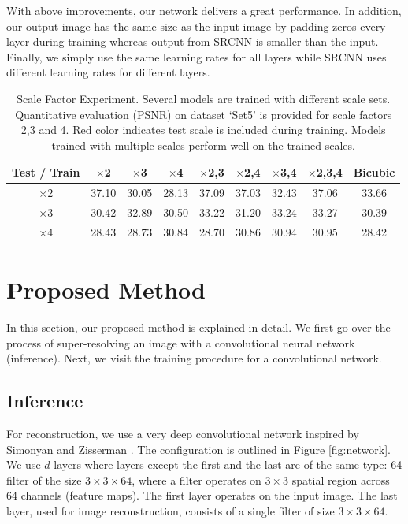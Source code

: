\documentclass[10pt,twocolumn,letterpaper]{article}
\begin{document}
With above improvements, our network delivers a great performance. In addition, our output image has the same size as the input image by padding zeros every layer during training whereas output from SRCNN is smaller than the input. Finally, we simply use the same learning rates for all layers while SRCNN uses different learning rates for different layers.

\begin{table}[t]
	\small
	\centering
\begin{tabular}
{|c|c|c|c|c|c|c|c||c|}
\hline 
 Test / Train & {$\times$2}& {$\times$3}& { $\times$4}& {$\times$2,3}& {$\times$2,4}& { $\times$3,4}& {$\times$2,3,4} & {Bicubic} \\
\hline
$\times$2  & \color{red} 37.10  & 30.05  & 28.13  & \color{red} 37.09  & \color{red} 37.03  & 32.43  & \color{red}37.06 &33.66   \\
$\times$3  & 30.42  & \color{red} 32.89  & 30.50  & \color{red} 33.22  & 31.20  & \color{red} 33.24  & \color{red} 33.27  & 30.39 \\
$\times$4  & 28.43  & 28.73  & \color{red} 30.84  & 28.70  & \color{red} 30.86  & \color{red} 30.94  & \color{red} 30.95 & 28.42  \\
\hline
\end{tabular}
	\vspace{1pt}
	\caption{Scale Factor Experiment. Several models are trained with different scale sets. Quantitative evaluation (PSNR) on dataset `Set5' is provided for scale factors 2,3 and 4.  {\color{red}Red color} indicates test scale is included during training. Models trained with multiple scales perform well on the trained scales. }
	\label{tab:SRCNN_Factor_Test}
\end{table}

\section{Proposed Method}
In this section, our proposed method is explained in detail. We first go over the process of super-resolving an image with a convolutional neural network (inference). Next, we visit the training procedure for a convolutional network.
\subsection{Inference}

For reconstruction, we use a very deep convolutional network inspired by Simonyan and Zisserman \cite{simonyan2015very}. The configuration is outlined in Figure \ref{fig:network}. We use $d$ layers where layers except the first and the last are of the same type: 64 filter of the size $3\times 3 \times64$, where a filter operates on $3\times3$ spatial region across 64 channels (feature maps). The first layer operates on the input image. The last layer, used for image reconstruction, consists of a single filter of size $3\times 3 \times64$.
\end{document}
